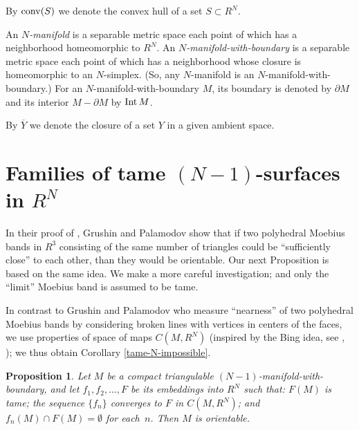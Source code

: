 \documentclass[12pt]{article}
\newtheorem{proposition}[theorem]{Proposition}
\theoremstyle{definition}
\begin{document}
By $\operatorname{conv} (S)$ we denote the convex hull of a set $S\subset R^N$.


An {\it $N$-manifold} is
a separable metric space
each point of which has a neighborhood
homeomorphic to $R^N$.
An {\it $N$-manifold-with-boundary}
is
a separable metric space
each point of which has a neighborhood
whose closure is homeomorphic to 
an $N$-simplex.
(So, any $N$-manifold is an $N$-manifold-with-boundary.)
For an $N$-manifold-with-boundary $M$, its
boundary is denoted by $\partial M$ and
its interior 
$M - \partial M$
by $\operatorname{Int} M $.

By $\overline Y$ we denote the closure of a set $Y$
in a given ambient space.

\section{Families of tame $(N-1)$-surfaces in $R^N$}


In their proof of \cite[Thm. 2]{GP},
Grushin and Palamodov show that if
two polyhedral Moebius bands in $R^3$
consisting of the same number of triangles
could be ``sufficiently close'' to each other,
than they would be orientable.
Our next Proposition is based on the same idea.
We make a more careful investigation;
and only
the ``limit'' Moebius band is assumed
to be tame.

In contrast to Grushin and Palamodov who measure
``nearness'' of two polyhedral Moebius bands by
considering broken lines with vertices 
in centers of the faces,
we use properties of space of maps
$C(M,R^N)$ (inspired by 
the Bing idea, see
\cite[Thm. 3.6.1]{BC}, \cite{Bing-abstr}); 
we thus obtain
Corollary \ref{tame-N-impossible}.


\begin{proposition}\label{tame-N}
Let $M$ be a compact triangulable
$(N-1)$-manifold-with-boundary,
and let $f_1,f_2,\ldots , F$ be its embeddings
into $R^N$ such that:
$F(M)$ is tame;
the sequence $\{f_n\}$ converges to $F$
in $C(M,R^N)$;
and 
$f_n(M)\cap F(M)=\emptyset $ for each~$n$.
Then $M$ is orientable.
\end{proposition}
\end{document}

